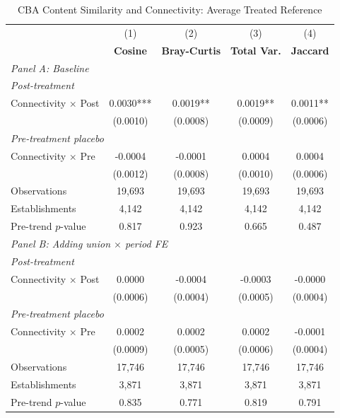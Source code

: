 \begin{table}[H]
\centering
\caption{CBA Content Similarity and Connectivity: Average Treated Reference}
\scriptsize
\setlength{\tabcolsep}{8pt}
\begin{tabular}{lcccc}
\hline\hline
 & (1) & (2) & (3) & (4) \\
 & \textbf{Cosine} & \textbf{Bray-Curtis} & \textbf{Total Var.} & \textbf{Jaccard} \\
\hline
\multicolumn{5}{l}{\textit{Panel A: Baseline}} \\
\multicolumn{5}{l}{\textit{Post-treatment}} \\
Connectivity $\times$ Post & 0.0030*** & 0.0019** & 0.0019** & 0.0011** \\
 & (0.0010) & (0.0008) & (0.0009) & (0.0006) \\
\multicolumn{5}{l}{\textit{Pre-treatment placebo}} \\
Connectivity $\times$ Pre & -0.0004 & -0.0001 & 0.0004 & 0.0004 \\
 & (0.0012) & (0.0008) & (0.0010) & (0.0006) \\
\hline
Observations &       19,693 &       19,693 &       19,693 &       19,693 \\
Establishments &        4,142 &        4,142 &        4,142 &        4,142 \\
Pre-trend $p$-value & 0.817 & 0.923 & 0.665 & 0.487 \\
\hline
\multicolumn{5}{l}{\textit{Panel B: Adding union $\times$ period FE}} \\
\multicolumn{5}{l}{\textit{Post-treatment}} \\
Connectivity $\times$ Post & 0.0000 & -0.0004 & -0.0003 & -0.0000 \\
 & (0.0006) & (0.0004) & (0.0005) & (0.0004) \\
\multicolumn{5}{l}{\textit{Pre-treatment placebo}} \\
Connectivity $\times$ Pre & 0.0002 & 0.0002 & 0.0002 & -0.0001 \\
 & (0.0009) & (0.0005) & (0.0006) & (0.0004) \\
\hline
Observations &       17,746 &       17,746 &       17,746 &       17,746 \\
Establishments &        3,871 &        3,871 &        3,871 &        3,871 \\
Pre-trend $p$-value & 0.835 & 0.771 & 0.819 & 0.791 \\
\hline\hline
\end{tabular}
\begin{minipage}{\linewidth}

\end{minipage}
\end{table}
